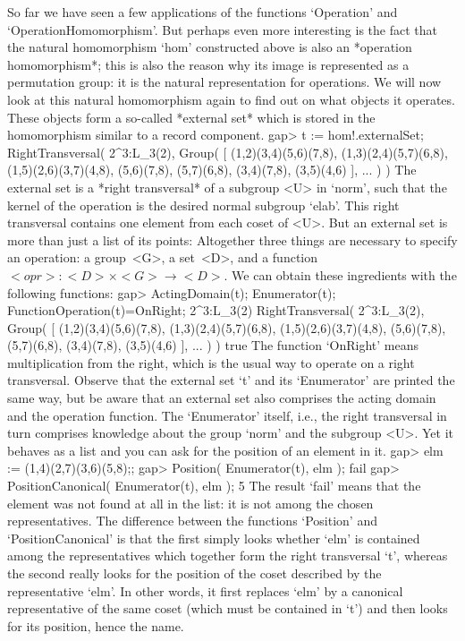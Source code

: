 So far we have  seen a few  applications of the functions `Operation' and
`OperationHomomorphism'.  But perhaps even more   interesting is the fact
that   the  natural homomorphism `hom'    constructed  above is  also  an
*operation homomorphism*;  this is also the
reason why  its image is represented  as  a permutation group: it  is the
natural  representation for operations. We  will now look at this natural
homomorphism again to find out on what objects it operates. These objects
form  a so-called  *external set* which  is  stored  in the  homomorphism
similar to a record component.
\beginexample
    gap> t := hom!.externalSet;
    RightTransversal( 2^3:L_3(2), Group( 
    [ (1,2)(3,4)(5,6)(7,8), (1,3)(2,4)(5,7)(6,8), (1,5)(2,6)(3,7)(4,8), 
      (5,6)(7,8), (5,7)(6,8), (3,4)(7,8), (3,5)(4,6) ], ... ) )
\endexample
The external  set is a *right  transversal* of a  subgroup <U> in `norm',
such  that  the kernel of the   operation is the desired  normal subgroup
`elab'.  This right transversal contains  one  element from each coset of
<U>. But   an external  set   is more than just  a   list of its  points:
Altogether  three things are  necessary    to  specify an  operation:   a
group~<G>, a set~<D>, and a  function $<opr>\colon <D>\times <G>\to <D>$.
We can obtain these ingredients with the following functions:
\beginexample
    gap> ActingDomain(t); Enumerator(t); FunctionOperation(t)=OnRight;
    2^3:L_3(2)
    RightTransversal( 2^3:L_3(2), Group( 
    [ (1,2)(3,4)(5,6)(7,8), (1,3)(2,4)(5,7)(6,8), (1,5)(2,6)(3,7)(4,8), 
      (5,6)(7,8), (5,7)(6,8), (3,4)(7,8), (3,5)(4,6) ], ... ) )
    true
\endexample
The function `OnRight' means multiplication from the  right, which is the
usual  way to operate on a  right transversal.  Observe that the external
set `t' and its `Enumerator' are printed the  same way, but be aware that
an external   set also comprises    the acting domain and  the  operation
function.  The `Enumerator' itself, i.e., the  right  transversal in turn
comprises knowledge  about the group `norm' and  the subgroup <U>. Yet it
behaves as a list and you can ask for the position of an element in it.
\beginexample
    gap> elm := (1,4)(2,7)(3,6)(5,8);;
    gap> Position( Enumerator(t), elm );
    fail
    gap> PositionCanonical( Enumerator(t), elm );
    5
\endexample
The result `fail' means  that the element   was not found  at all  in the
list:   it   is    not    among  the      chosen  representatives.    The
difference between the functions `Position' and
`PositionCanonical' is that the  first   simply looks whether `elm'    is
contained  among  the   representatives which   together  form the  right
transversal `t', whereas the second really looks  for the position of the
coset described by the  representative `elm'. In   other words, it  first
replaces `elm'  by a  canonical representative of  the  same coset (which
must be  contained in `t')  and then  looks for  its position, hence  the
name.

